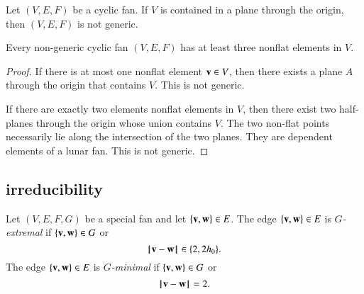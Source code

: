 \begin{lemma}
Let $(V,E,F)$ be a cyclic fan.
If $V$ is contained in a plane through the origin, then $(V,E,F)$ is not generic.
\end{lemma}

\begin{lemma}\label{lemma:3-nonflat}
Every non-generic cyclic fan $(V,E,F)$ has at least three nonflat elements in $V$.
\end{lemma}

\begin{proof}
If there is at most one nonflat element ${\mathbf v}\in V$, then there exists a plane $A$ through the origin that contains $V$.  This is not generic.

If there are exactly two elements nonflat elements in $V$, then there exist two half-planes through the origin whose union contains $V$.  The two non-flat points necessarily lie along the intersection of the two planes.  They are dependent elements of a lunar fan.  This is not generic.
\end{proof}

\subsection{irreducibility}

\begin{definition} Let $(V,E,F,G)$ be a special fan and let $\{{\mathbf v},{\mathbf w}\}\in E$.
The edge $\{{\mathbf v},{\mathbf w}\}\in E$ is {\it $G$-extremal} if $\{{\mathbf v},{\mathbf w}\}\in G$ or
$$
{\hskip0.1em|\hskip-0.15em|\hskip0.1em}{\mathbf v} - {\mathbf w}{\hskip0.1em|\hskip-0.15em|\hskip0.1em}\in\{2,2{h_0}\}.
$$
The edge $\{{\mathbf v},{\mathbf w}\}\in E$ is {\it $G$-minimal} if $\{{\mathbf v},{\mathbf w}\}\in G$ or
$$
{\hskip0.1em|\hskip-0.15em|\hskip0.1em}{\mathbf v} - {\mathbf w}{\hskip0.1em|\hskip-0.15em|\hskip0.1em}=2.
$$
\end{definition}

